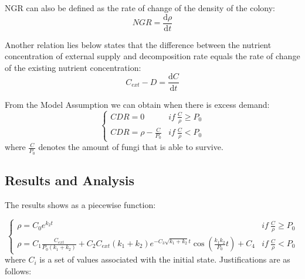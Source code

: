 \documentclass[12pt]{article}
\begin{document}
NGR can also be defined as the rate of change of the density of the colony:
\begin{equation}
	NGR=\frac{\mathrm{d}\rho }{\mathrm{d}t} 
\end{equation}

Another relation lies below states that the difference between the nutrient concentration of external supply and decomposition rate equals the rate of change of the existing nutrient concentration:
\begin{equation}
	C_{ext}-D=\frac{\mathrm{d}C}{\mathrm{d}t} 
\end{equation}

From the Model Assumption we can obtain when there is excess demand: 	
\begin{equation}
	\begin{cases}
		CDR=0&if\  \frac{C}{\rho } \geqslant P_{0}\\ 
		CDR=\rho-\frac{C}{P_{0}}&if\  \frac{C}{\rho } <P_{0}
	\end{cases} 
\end{equation} 
where $\frac{C}{P_{0}}$ denotes the amount of fungi that is able to survive.
\subsection{Results and Analysis}
The results shows as a piecewise function:

\begin{equation}
	\begin{cases}
		\rho=C_{0}e^{k_{2}t}&if\  \frac{C}{\rho } \geqslant P_{0}\\ 
		\rho=C_{1}\frac{C_{ext}}{P_{0}(k_{1}+k_{2})}+C_{2}C_{ext}(k_{1}+k_{2})e^{-C_{3}\sqrt{k_{1}+k_{2}} t}\cos \left( \frac{k_{1}k_{2}}{P_{0}}t\right)+C_{4} &if\  \frac{C}{\rho } <P_{0}
	\end{cases} 
\end{equation} 
where $C_{i}$ is a set of values associated with the initial state. Justifications are as follows:
\end{document}
